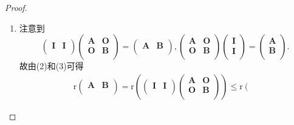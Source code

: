 \documentclass[lang=cn,newtx,10pt,scheme=chinese]{elegantbook}
\begin{document}
\begin{proof}
\begin{enumerate}[(1)]
    \item  注意到
    \[
        \left( \begin{matrix}
            \boldsymbol{I}&		\boldsymbol{I}\\
        \end{matrix} \right) \left( \begin{matrix}
            \boldsymbol{A}&		\boldsymbol{O}\\
            \boldsymbol{O}&		\boldsymbol{B}\\
        \end{matrix} \right) =\left( \begin{matrix}
            \boldsymbol{A}&		\boldsymbol{B}\\
        \end{matrix} \right) ,\left( \begin{matrix}
            \boldsymbol{A}&		\boldsymbol{O}\\
            \boldsymbol{O}&		\boldsymbol{B}\\
        \end{matrix} \right) \left( \begin{array}{c}
            \boldsymbol{I}\\
            \boldsymbol{I}\\
        \end{array} \right) =\left( \begin{array}{c}
            \boldsymbol{A}\\
            \boldsymbol{B}\\
        \end{array} \right) .
    \]
    故由(2)和(3)可得
    \begin{align*}
        \mathrm{r}\left( \begin{matrix}
            \boldsymbol{A}&		\boldsymbol{B}\\
        \end{matrix} \right) =\mathrm{r}\left( \left( \begin{matrix}
            \boldsymbol{I}&		\boldsymbol{I}\\
        \end{matrix} \right) \left( \begin{matrix}
            \boldsymbol{A}&		\boldsymbol{O}\\
            \boldsymbol{O}&		\boldsymbol{B}\\
        \end{matrix} \right) \right) \leqslant \mathrm{r}\left( \begin{matrix}

\end{matrix}
\end{align*}
\end{enumerate}
\end{proof}
\end{document}
